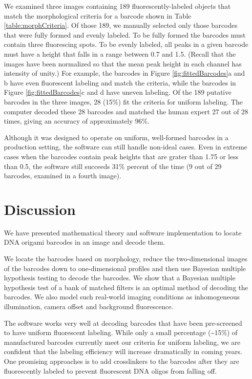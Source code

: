 We examined three images containing 189 fluorescently-labeled objects that match the morphological criteria for a barcode shown in Table \ref{table:morphCriteria}. Of those 189, we manually selected only those barcodes that were fully formed and evenly labeled. To be fully formed the barcodes must contain three fluorescing spots. To be evenly labeled, all peaks in a given barcode must have a height that falls in a range between 0.7 and 1.5. (Recall that the images have been normalized so that the mean peak height in each channel has intensity of unity.) For example, the barcodes in Figure \ref{fig:fittedBarcodes}a and b have even fluorescent labeling and match the criteria, while the barcodes in Figure \ref{fig:fittedBarcodes}c and d have uneven labeling. Of the 189 putative barcodes in the three images, 28 (15\%) fit the criteria for uniform labeling.   The computer decoded these 28 barcodes and matched the human expert 27 out of 28 times, giving an accuracy of approximately 96\%.


Although it was designed to operate on uniform, well-formed barcodes in a production setting, the software can still handle non-ideal cases. Even in extreme cases when the barcodes contain peak heights that are grater than 1.75 or  less than 0.5, the software still succeeds 31\% percent of the time (9 out of 29 barcodes, examined in a fourth image).


\section{Discussion}
We have presented mathematical theory and software implementation to locate DNA origami barcodes in an image and decode them. 

We locate the barcodes based on morphology, reduce the two-dimensional images of the barcodes down to one-dimensional profiles and then use Bayesian multiple hypothesis testing to decode the barcodes.  We show that a Bayesian multiple hypothesis test of a bank of matched filters is an optimal method of decoding the barcodes. We also model  such real-world imaging conditions as inhomogeneous illumination, camera offset and background fluorescence. 

The software works very well at decoding barcodes that have been pre-screened to have uniform fluorescent labeling. While  only a small percentage (\textasciitilde 15\%) of manufactured barcodes currently meet our criteria for uniform labeling, we are confident that the labeling efficiency will increase dramatically in coming years. One promising approaches is to add crosslinkers to the barcodes after they are fluorescently labeled to prevent fluorescent  DNA oligos from falling off.    



